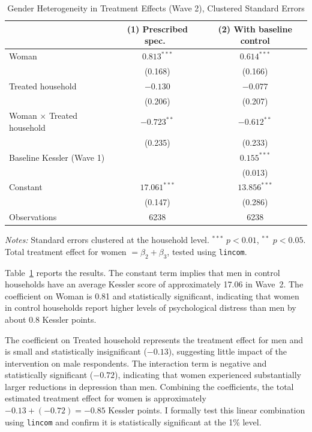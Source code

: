 \documentclass[12pt]{article}
\begin{document}
\begin{table}[H]
\centering
\caption{Gender Heterogeneity in Treatment Effects (Wave 2), Clustered Standard Errors}
\label{tab:gender_het}
\begin{tabular}{lcc}
\toprule
 & (1) Prescribed spec.\ & (2) With baseline control \\
\midrule
Woman & $0.813^{***}$ & $0.614^{***}$ \\
 & (0.168) & (0.166) \\[4pt]
Treated household & $-0.130$ & $-0.077$ \\
 & (0.206) & (0.207) \\[4pt]
Woman $\times$ Treated household & $-0.723^{**}$ & $-0.612^{**}$ \\
 & (0.235) & (0.233) \\[4pt]
Baseline Kessler (Wave 1) & & $0.155^{***}$ \\
 & & (0.013) \\[4pt]
Constant & $17.061^{***}$ & $13.856^{***}$ \\
 & (0.147) & (0.286) \\
\midrule
Observations & 6238 & 6238 \\
\bottomrule
\end{tabular}
\begin{flushleft}
\small\textit{Notes:} Standard errors clustered at the household level. $^{***}$ $p<0.01$, $^{**}$ $p<0.05$. Total treatment effect for women $= \beta_2 + \beta_3$, tested using \texttt{lincom}.
\end{flushleft}
\end{table}

Table~\ref{tab:gender_het} reports the results. The constant term implies that men in control households have an average Kessler score of approximately 17.06 in Wave~2. The coefficient on Woman is 0.81 and statistically significant, indicating that women in control households report higher levels of psychological distress than men by about 0.8 Kessler points.

The coefficient on Treated household represents the treatment effect for men and is small and statistically insignificant ($-0.13$), suggesting little impact of the intervention on male respondents. The interaction term is negative and statistically significant ($-0.72$), indicating that women experienced substantially larger reductions in depression than men. Combining the coefficients, the total estimated treatment effect for women is approximately $-0.13 + (-0.72) = -0.85$ Kessler points. I formally test this linear combination using \texttt{lincom} and confirm it is statistically significant at the 1\% level.
\end{document}

